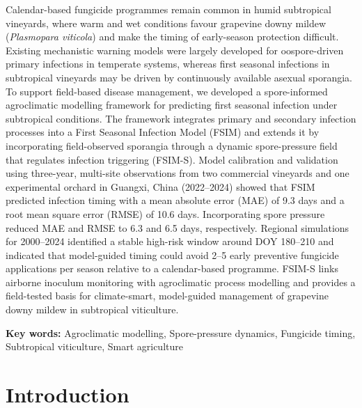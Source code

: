 \documentclass[
]{article}
\begin{document}
Calendar-based fungicide programmes remain common in humid subtropical
vineyards, where warm and wet conditions favour grapevine downy mildew
(\emph{Plasmopara viticola}) and make the timing of early-season
protection difficult. Existing mechanistic warning models were largely
developed for oospore-driven primary infections in temperate systems,
whereas first seasonal infections in subtropical vineyards may be driven
by continuously available asexual sporangia. To support field-based
disease management, we developed a spore-informed agroclimatic modelling
framework for predicting first seasonal infection under subtropical
conditions. The framework integrates primary and secondary infection
processes into a First Seasonal Infection Model (FSIM) and extends it by
incorporating field-observed sporangia through a dynamic spore-pressure
field that regulates infection triggering (FSIM-S). Model calibration
and validation using three-year, multi-site observations from two
commercial vineyards and one experimental orchard in Guangxi, China
(2022--2024) showed that FSIM predicted
infection timing with a mean absolute error (MAE) of 9.3 days and a root
mean square error (RMSE) of 10.6 days. Incorporating spore pressure
reduced MAE and RMSE to 6.3 and 6.5 days, respectively. Regional
simulations for 2000--2024 identified a stable high-risk window around
DOY 180--210 and indicated that model-guided timing could avoid 2--5
early preventive fungicide applications per season relative to a
calendar-based programme. FSIM-S links airborne inoculum monitoring with
agroclimatic process modelling and provides a field-tested basis for
climate-smart, model-guided management of grapevine downy mildew in
subtropical viticulture.

\textbf{Key words:} Agroclimatic modelling, Spore-pressure dynamics,
Fungicide timing, Subtropical viticulture, Smart agriculture

\section{Introduction}\label{introduction}
\end{document}
